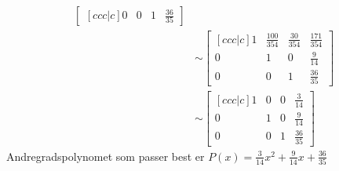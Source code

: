 \documentclass[11pt, a4paper, norsk]{NTNUoving}
\begin{document}
\begin{oppgave}
\begin{punkt}
\begin{align*}
\begin{bmatrix}[ccc|c]
                    0 & 0 & 1 & \frac{36}{35}
               \end{bmatrix}
                \\
                &\sim \begin{bmatrix}[ccc|c]
                    1 & \frac{100}{354} & \frac{30}{354} & \frac{171}{354} \\
                    0 & 1 & 0 & \frac{9}{14} \\
                    0 & 0 & 1 & \frac{36}{35}
               \end{bmatrix}
                \\
                &\sim \begin{bmatrix}[ccc|c]
                    1 & 0 & 0 & \frac{3}{14} \\
                    0 & 1 & 0 & \frac{9}{14} \\
                    0 & 0 & 1 & \frac{36}{35}
               \end{bmatrix}
           \end{align*}
           Andregradspolynomet som passer best er $P(x) = \frac{3}{14}x^2 + \frac{9}{14}x + \frac{36}{35}$
       \end{punkt}
   \end{oppgave}
\end{document}
